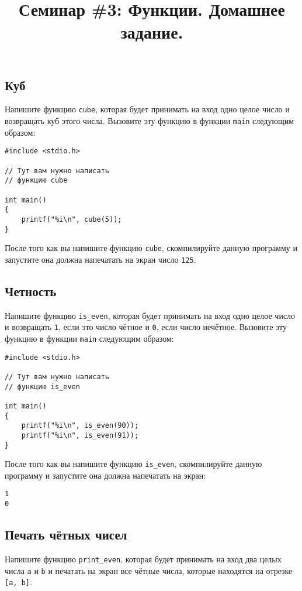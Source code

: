 \documentclass{article}
\begin{document}

\title{Семинар \#3: Функции. Домашнее задание. \vspace{-5ex}}\date{}\maketitle
\subsection{Куб}
Напишите функцию \texttt{cube}, которая будет принимать на вход одно целое число и возвращать куб этого числа. Вызовите эту функцию в функции \texttt{main} следующим образом:
\begin{lstlisting}
#include <stdio.h>

// Тут вам нужно написать
// функцию cube

int main()
{
    printf("%i\n", cube(5));
}
\end{lstlisting}

После того как вы напишите функцию \texttt{cube}, скомпилируйте данную программу и запустите она должна напечатать на экран число \texttt{125}.


\subsection{Четность}
Напишите функцию \texttt{is\_even}, которая будет принимать на вход одно целое число и возвращать \texttt{1}, если это число чётное и \texttt{0}, если число нечётное. Вызовите эту функцию в функции \texttt{main} следующим образом:
\begin{lstlisting}
#include <stdio.h>

// Тут вам нужно написать
// функцию is_even

int main()
{
    printf("%i\n", is_even(90));
    printf("%i\n", is_even(91));
}
\end{lstlisting}
После того как вы напишите функцию \texttt{is\_even}, скомпилируйте данную программу и запустите она должна напечатать на экран:
\begin{verbatim}
1
0
\end{verbatim}

\subsection{Печать чётных чисел}
Напишите функцию \texttt{print\_even}, которая будет принимать на вход два целых числа \texttt{a} и \texttt{b} и печатать на экран все чётные числа, которые находятся на отрезке \texttt{[a, b]}.
\end{document}
